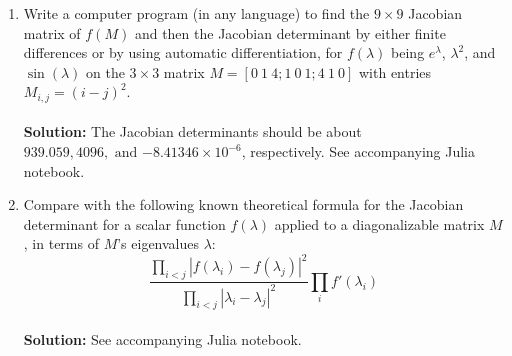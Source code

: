 \documentclass{article}
\begin{document}
\begin{enumerate}
\begin{enumerate}
\item Write a computer program (in any language) to find the $9\times 9$ Jacobian matrix of $f(M)$ and then the Jacobian determinant  by either finite differences or by using
automatic differentiation, for $f(\lambda)$ being $e^\lambda$, $\lambda^2$, and $\sin(\lambda)$ on the $3\times 3$ matrix $M = [0\: 1\: 4;1\: 0\: 1;4\: 1\: 0]$ with entries $M_{i,j} = (i-j)^2$.
\\
\\
\textbf{Solution:} The Jacobian determinants should be about $\boxed{939.059, 4096, \text{ and } {-8.41346\times10^{-6}}}$, respectively. See accompanying Julia notebook.


\item Compare with the following known theoretical formula for the 
Jacobian determinant for a scalar function $f(\lambda)$ applied to a diagonalizable matrix $M$,  in terms of $M$'s eigenvalues $\lambda$:
$$
\frac{\prod_{i < j} |f(\lambda_i)-
f(\lambda_j)|^2}{\prod_{i < j} |\lambda_i-\lambda_j|^2}
\prod_i f'(\lambda_i)
$$
\\
\textbf{Solution:} See accompanying Julia notebook.


\end{enumerate}



\end{enumerate}
\end{document}
